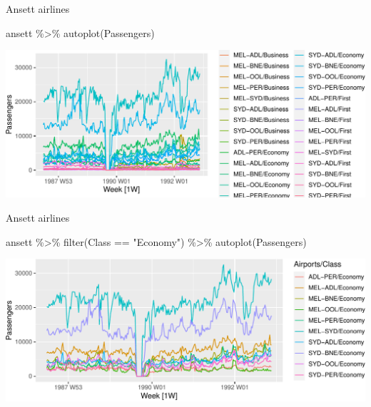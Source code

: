 \documentclass[14pt,ignorenonframetext,aspectratio=169]{beamer}
\newenvironment{Shaded}{\begin{snugshade}}{\end{snugshade}}
\newcommand{\FunctionTok}[1]{\textcolor[rgb]{0.00,0.00,0.00}{#1}}
\newcommand{\NormalTok}[1]{#1}
\newcommand{\SpecialCharTok}[1]{\textcolor[rgb]{0.00,0.00,0.00}{#1}}
\newcommand{\StringTok}[1]{\textcolor[rgb]{0.31,0.60,0.02}{#1}}
\renewenvironment{Shaded}{\color{black}\begin{snugshade}\color{black}}{\end{snugshade}}
\renewenvironment{Shaded}{\color{black}\fontsize{10}{10}\sf\begin{snugshade}\color{black}}{\end{snugshade}}
\begin{document}
\begin{frame}[fragile]{Ansett airlines}
\protect\hypertarget{ansett-airlines}{}
\fontsize{10}{10}\sf

\begin{Shaded}
\begin{Highlighting}[]
\NormalTok{ansett }\SpecialCharTok{\%\textgreater{}\%}
  \FunctionTok{autoplot}\NormalTok{(Passengers)}
\end{Highlighting}
\end{Shaded}

\includegraphics{2-tsgraphics_files/figure-beamer/unnamed-chunk-4-1.pdf}
\end{frame}

\begin{frame}[fragile]{Ansett airlines}
\protect\hypertarget{ansett-airlines-1}{}
\fontsize{10}{10}\sf

\begin{Shaded}
\begin{Highlighting}[]
\NormalTok{ansett }\SpecialCharTok{\%\textgreater{}\%}
  \FunctionTok{filter}\NormalTok{(Class }\SpecialCharTok{==} \StringTok{"Economy"}\NormalTok{) }\SpecialCharTok{\%\textgreater{}\%}
  \FunctionTok{autoplot}\NormalTok{(Passengers)}
\end{Highlighting}
\end{Shaded}

\includegraphics{2-tsgraphics_files/figure-beamer/unnamed-chunk-5-1.pdf}
\end{frame}
\end{document}

